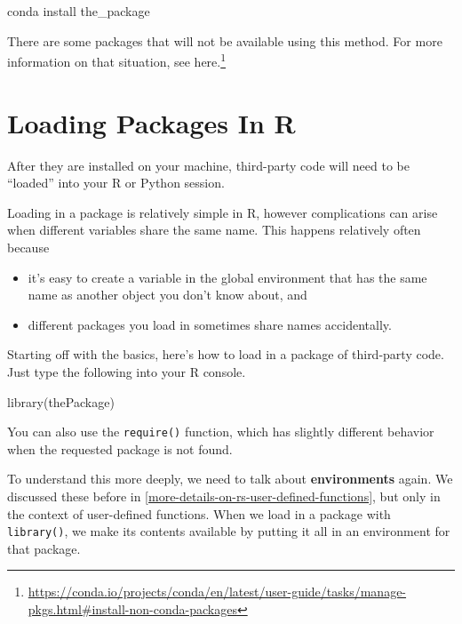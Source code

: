 \documentclass[
  12pt,
  krantz2]{krantz}
\makeatletter
\newenvironment{Shaded}{\begin{snugshade}}{\end{snugshade}}
\newcommand{\ExtensionTok}[1]{#1}
\newcommand{\FunctionTok}[1]{\textcolor[rgb]{0,0,0}{#1}}
\newcommand{\NormalTok}[1]{#1}
\providecommand{\tightlist}{%
  \setlength{\itemsep}{0pt}\setlength{\parskip}{0pt}}
\renewcommand{\href}[2]{#2\footnote{\url{#1}}}
\newenvironment{kframe}{%
\medskip{}
\setlength{\fboxsep}{.8em}
 \def\at@end@of@kframe{}%
 \ifinner\ifhmode%
  \def\at@end@of@kframe{\end{minipage}}%
  \begin{minipage}{\columnwidth}%
 \fi\fi%
 \def\FrameCommand##1{\hskip\@totalleftmargin \hskip-\fboxsep
 \colorbox{shadecolor}{##1}\hskip-\fboxsep
     \hskip-\linewidth \hskip-\@totalleftmargin \hskip\columnwidth}%
 \MakeFramed {\advance\hsize-\width
   \@totalleftmargin\z@ \linewidth\hsize
   \@setminipage}}%
 {\par\unskip\endMakeFramed%
 \at@end@of@kframe}
\renewenvironment{Shaded}{\begin{kframe}}{\end{kframe}}
\makeatother
\begin{document}
\begin{Shaded}
\begin{Highlighting}[]
\ExtensionTok{conda}\NormalTok{ install the\_package}
\end{Highlighting}
\end{Shaded}

There are some packages that will not be available using this method. For more information on that situation, see \href{https://conda.io/projects/conda/en/latest/user-guide/tasks/manage-pkgs.html\#install-non-conda-packages}{here.}

\hypertarget{loading-packages-in-r}{%
\section{Loading Packages In R}\label{loading-packages-in-r}}

After they are installed on your machine, third-party code will need to be ``loaded'' into your R or Python session.

Loading in a package is relatively simple in R, however complications can arise when different variables share the same name. This happens relatively often because

\begin{itemize}
\tightlist
\item
  it's easy to create a variable in the global environment that has the same name as another object you don't know about, and
\item
  different packages you load in sometimes share names accidentally.
\end{itemize}

Starting off with the basics, here's how to load in a package of third-party code. Just type the following into your R console.

\begin{Shaded}
\begin{Highlighting}[]
\FunctionTok{library}\NormalTok{(thePackage)}
\end{Highlighting}
\end{Shaded}

You can also use the \texttt{require()} function, which has slightly different behavior when the requested package is not found.

To understand this more deeply, we need to talk about \textbf{environments} again. We discussed these before in \ref{more-details-on-rs-user-defined-functions}, but only in the context of user-defined functions. When we load in a package with \texttt{library()}, we make its contents available by putting it all in an environment for that package.
\end{document}
